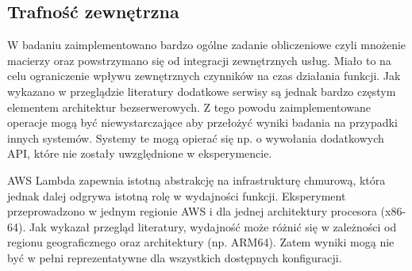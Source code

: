 \subsection*{Trafność zewnętrzna}

W badaniu zaimplementowano bardzo ogólne zadanie obliczeniowe czyli mnożenie macierzy oraz powstrzymano się od integracji zewnętrznych usług.
Miało to na celu ograniczenie wpływu zewnętrznych czynników na czas działania funkcji.
Jak wykazano w przeglądzie literatury dodatkowe serwisy są jednak bardzo częstym elementem architektur bezserwerowych.
Z tego powodu zaimplementowane operacje mogą być niewystarczające aby przełożyć wyniki badania na przypadki innych systemów.
Systemy te mogą opierać się np. o wywołania dodatkowych API, które nie zostały uwzględnione w eksperymencie.

AWS Lambda zapewnia istotną abstrakcję na infrastrukturę chmurową, która jednak dalej odgrywa istotną rolę w wydajności funkcji.
Eksperyment przeprowadzono w jednym regionie AWS i dla jednej architektury procesora (x86-64). 
Jak wykazał przegląd literatury, wydajność może różnić się w zależności od regionu geograficznego oraz architektury (np. ARM64). 
Zatem wyniki mogą nie być w pełni reprezentatywne dla wszystkich dostępnych konfiguracji.
